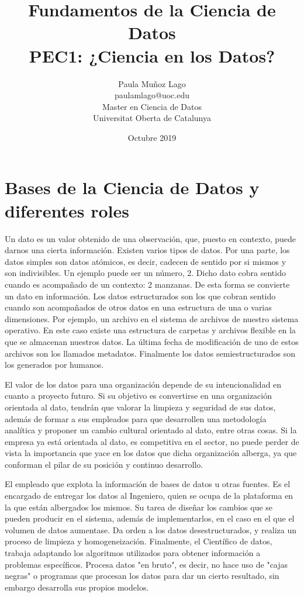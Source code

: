 \documentclass{article}
\title{Fundamentos de la Ciencia de Datos \\ PEC1: ¿Ciencia en los Datos?}
\author{Paula Muñoz Lago \\ paulamlago@uoc.edu \\ Master en Ciencia de Datos \\ Universitat Oberta de Catalunya}
\date{Octubre 2019}
\begin{document}
\maketitle

\section{Bases de la Ciencia de Datos y diferentes roles}

Un dato es un valor obtenido de una observación, que, puesto en contexto, puede darnos una cierta información.
Existen varios tipos de datos. Por una parte, los datos simples son datos atómicos, es decir, cadecen de sentido por si mismos y son indivisibles. Un ejemplo puede ser un número, 2. Dicho dato cobra sentido cuando es acompañado de un contexto: 2 manzanas. De esta forma se convierte un dato en información. Los datos estructurados son los que cobran sentido cuando son acompañados de otros datos en una estructura de una o varias dimensiones. Por ejemplo, un archivo en el sistema de archivos de nuestro sistema operativo. En este caso existe una estructura de carpetas y archivos flexible en la que se almacenan nuestros datos. La última fecha de modificación de uno de estos archivos son los llamados metadatos. Finalmente los datos semiestructurados son los generados por humanos.

El valor de los datos para una organización depende de su intencionalidad en cuanto a proyecto futuro. Si su objetivo es convertirse en una organización orientada al dato, tendrán que valorar la limpieza y seguridad de sus datos, además de formar a sus empleados para que desarrollen una metodología analítica y proponer un cambio cultural orientado al dato, entre otras cosas. Si la empresa ya está orientada al dato, es competitiva en el sector, no puede perder de vista la importancia que yace en los datos que dicha organización alberga, ya que conforman el pilar de su posición y continuo desarrollo.

El empleado que explota la información de bases de datos u otras fuentes. Es el encargado de entregar los datos al Ingeniero, quien se ocupa de la plataforma en la que están albergados los mismos. Su tarea de diseñar los cambios que se pueden producir en el sistema, además de implementarlos, en el caso en el que el volumen de datos aumentase. Da orden a los datos desestructurados, y realiza un proceso de limpieza y homogeneización.
Finalmente, el Científico de datos, trabaja adaptando los algoritmos utilizados para obtener información a problemas específicos. Procesa datos "en bruto", es decir, no hace uso de "cajas negras" o programas que procesan los datos para dar un cierto resultado, sin embargo desarrolla sus propios modelos. 
\end{document}
